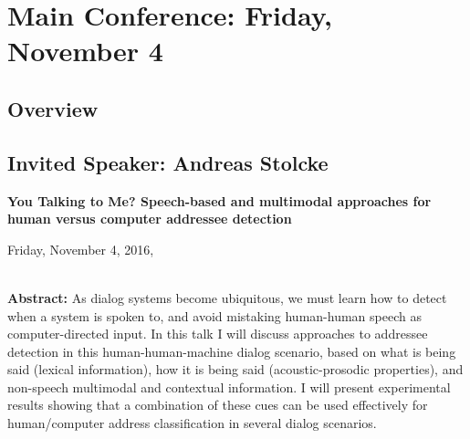 






\newpage

%


\chapter{Main Conference: Friday, November 4}
\thispagestyle{emptyheader}
\section*{Overview}

\clearpage{}


\section{Invited Speaker: Andreas Stolcke}

\begin{center}
\textbf{\Large{}You Talking to Me? Speech-based and multimodal approaches for human versus computer addressee detection}{\Large{}\vspace{1em}
}
\par\end{center}{\Large \par}

\begin{center}
Friday, November 4, 2016,  \vspace{1em}
\\
 \PlenaryLoc \\
 \vspace{1em}

\par\end{center}

\noindent \textbf{Abstract:} 
 As dialog systems become ubiquitous, we must learn how to detect when a system is spoken to, and avoid mistaking human-human speech as computer-directed input. In this talk I will discuss approaches to addressee detection in this human-human-machine dialog scenario, based on what is being said (lexical information), how it is being said (acoustic-prosodic properties), and non-speech multimodal and contextual information. I will present experimental results showing that a combination of these cues can be used effectively for human/computer address classification in several dialog scenarios. 

